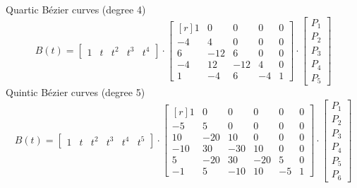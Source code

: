 \documentclass[10pt,letterpaper]{article}
\begin{document}
\newline
\newline
Quartic Bézier curves (degree 4)
\[
B(t) =
\begin{bmatrix} 1 & t & t^2 & t^3 & t^4 \end{bmatrix}
\cdot
\begin{bmatrix}[r]
1 & 0 & 0 & 0 & 0\\
-4 & 4 & 0 & 0 & 0\\
6 & -12 & 6 & 0 & 0\\
-4 & 12 & -12 & 4 & 0\\
1 & -4 & 6 & -4 & 1
\end{bmatrix}
\cdot
\begin{bmatrix}
P_1\\
P_2\\
P_3\\
P_4\\
P_5
\end{bmatrix}
\]
\newline
\newline
Quintic Bézier curves (degree 5)
\[
B(t) =
\begin{bmatrix} 1 & t & t^2 & t^3 & t^4 & t^5 \end{bmatrix}
\cdot
\begin{bmatrix}[r]
1 & 0 & 0 & 0 & 0 & 0\\
-5 & 5 & 0 & 0 & 0 & 0\\
10 & -20 & 10 & 0 & 0 & 0\\
-10 & 30 & -30 & 10 & 0 & 0\\
5 & -20 & 30 & -20 & 5 & 0\\
-1 & 5 & -10 & 10 & -5 & 1
\end{bmatrix}
\cdot
\begin{bmatrix}
P_1\\
P_2\\
P_3\\
P_4\\
P_5\\
P_6
\end{bmatrix}
\]
\newline
\end{document}
